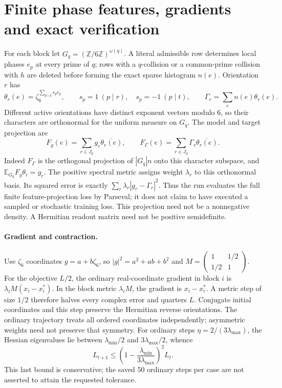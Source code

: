 \documentclass[11pt,oneside,openany]{book}
\theoremstyle{definition}\newtheorem{definition}[theorem]{Definition}
\theoremstyle{remark}\newtheorem{remark}[theorem]{Remark}
\begin{document}
\section{Finite phase features, gradients and exact verification}\label{arl:details}
For each block let $G_q=(\mathbb Z/6\mathbb Z)^{\omega(q)}$.
A literal admissible row determines local phases $e_p$ at every prime of $q$;
rows with a $q$-collision or a common-prime collision with $h$ are deleted
before forming the exact sparse histogram $n(e)$. Orientation $r$ has
\[
 \theta_r(e)=\zeta_6^{\sum_{p\mid q}s_p e_p},\qquad
 s_p=1\ (p\mid r),\quad s_p=-1\ (p\mid t),\qquad
 \Gamma_r=\sum_e n(e)\theta_r(e).
\]
Different active orientations have distinct exponent vectors modulo $6$,
so their characters are orthonormal for the uniform measure on $G_q$.
The model and target projection are
\[
 F_g(e)=\sum_{r\in J_q}g_r\overline{\theta_r(e)},\qquad
 F_\Gamma(e)=\sum_{r\in J_q}\Gamma_r\overline{\theta_r(e)}.
\]
Indeed $F_\Gamma$ is the orthogonal projection of $|G_q|n$ onto this
character subspace, and $\mathbb E_{G_q}F_g\theta_r=g_r$.
The positive spectral metric assigns weight $\lambda_r$ to this orthonormal
basis. Its squared error is exactly $\sum_r\lambda_r|g_r-\Gamma_r|^2$.
Thus the run evaluates the full finite feature-projection loss by Parseval;
it does not claim to have executed a sampled or stochastic training loss.
This projection need not be a nonnegative density. A Hermitian readout matrix
need not be positive semidefinite.

\paragraph{Gradient and contraction.}
Use $\zeta_6$ coordinates $g=a+b\zeta_6$, so
$|g|^2=a^2+ab+b^2$ and
$M=\left(\begin{smallmatrix}1&1/2\\1/2&1\end{smallmatrix}\right)$.
For the objective $L/2$, the ordinary real-coordinate gradient in block $i$
is $\lambda_i M(x_i-x_i^*)$.
In the block metric $\lambda_iM$, the gradient is $x_i-x_i^*$.
A metric step of size $1/2$ therefore halves every complex error and quarters
$L$. Conjugate initial coordinates and this step preserve the Hermitian
reverse orientations. The ordinary trajectory treats all ordered coordinates
independently; asymmetric weights need not preserve that symmetry.
For ordinary steps $\eta=2/(3\lambda_{\max})$, the Hessian eigenvalues
lie between $\lambda_{\min}/2$ and $3\lambda_{\max}/2$, whence
\[
 L_{t+1}\le\left(1-\frac{\lambda_{\min}}{3\lambda_{\max}}\right)^2L_t.
\]
This last bound is conservative; the saved $50$ ordinary steps per case are
not asserted to attain the requested tolerance.
\end{document}
